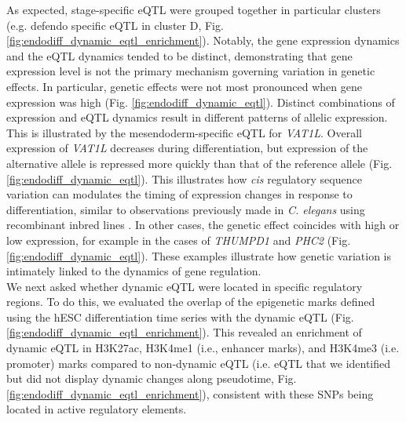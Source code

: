 As expected, stage-specific eQTL were grouped together in particular clusters (e.g. defendo specific eQTL in cluster D, Fig. \ref{fig:endodiff_dynamic_eqtl_enrichment}). 
Notably, the gene expression dynamics and the eQTL dynamics tended to be distinct, demonstrating that gene expression level is not the primary mechanism governing variation in genetic effects. 
In particular, genetic effects were not most pronounced when gene expression was high (Fig. \ref{fig:endodiff_dynamic_eqtl}).
Distinct combinations of expression and eQTL dynamics result in different patterns of allelic expression. 
This is illustrated by the mesendoderm-specific eQTL for \textit{VAT1L}. 
Overall expression of \textit{VAT1L} decreases during differentiation, but expression of the alternative allele is repressed more quickly than that of the reference allele (Fig. \ref{fig:endodiff_dynamic_eqtl}). 
This illustrates how \textit{cis} regulatory sequence variation can modulates the timing of expression changes in response to differentiation, similar to observations previously made in \textit{C. elegans} using recombinant inbred lines \cite{francesconi2014effects}. 
In other cases, the genetic effect coincides with high or low expression, for example in the cases of \textit{THUMPD1} and \textit{PHC2} (Fig. \ref{fig:endodiff_dynamic_eqtl}). 
These examples illustrate how genetic variation is intimately linked to the dynamics of gene regulation. \\

We next asked whether dynamic eQTL were located in specific regulatory regions. 
To do this, we evaluated the overlap of the epigenetic marks defined using the hESC differentiation time series with the dynamic eQTL (Fig. \ref{fig:endodiff_dynamic_eqtl_enrichment}). 
This revealed an enrichment of dynamic eQTL in H3K27ac, H3K4me1 (i.e., enhancer marks), and H3K4me3 (i.e. promoter) marks compared to non-dynamic eQTL (i.e. eQTL that we identified but did not display dynamic changes along pseudotime, Fig. \ref{fig:endodiff_dynamic_eqtl_enrichment}), consistent with these SNPs being located in active regulatory elements.


